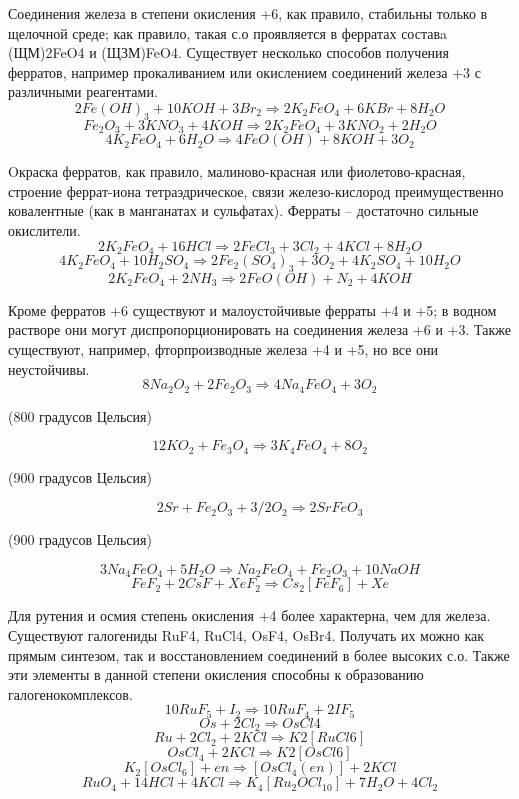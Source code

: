 \documentclass[11pt]{article}
\begin{document}
Соединения железа в степени окисления +6, как правило, стабильны только в щелочной
среде; как правило, такая с.о проявляется в ферратах составa (ЩМ)2FeO4 и (ЩЗМ)FeO4.
Существует несколько способов получения ферратов, например прокаливанием или
окислением соединений железа +3 с различными реагентами.
$$2Fe(OH) _3 + 10KOH + 3Br _2 \Rightarrow 2K _2 FeO _4 + 6KBr + 8H _2 O$$
$$Fe _2 O _3 + 3KNO _3 + 4KOH \Rightarrow 2K _2 FeO _4 + 3KNO _2 + 2H _2 O$$
$$4K _2 FeO _4 + 6H _2 O \Rightarrow 4FeO(OH) + 8KOH + 3O _2$$

Oкраска ферратов, как правило, малиново-красная или фиолетово-красная, строение
феррат-иона тетраэдрическое, связи железо-кислород преимущественно ковалентные
(как в манганатах и сульфатах). Ферраты – достаточно сильные окислители.
$$2K _2 FeO _4 + 16HCl \Rightarrow 2FeCl_3 + 3Cl_2 + 4KCl + 8H_2O$$
$$4K _2 FeO _4 + 10H_2SO_4 \Rightarrow 2Fe_2(SO_4)_3 + 3O_2 + 4K_2SO_4 + 10H_2O$$
$$2K _2 FeO _4 + 2NH_3 \Rightarrow 2FeO(OH) + N_2 + 4KOH$$

Кроме ферратов +6 существуют и малоустойчивые ферраты +4 и +5; в водном растворе
они могут диспропорционировать на соединения железа +6 и +3. Также существуют,
например, фторпроизводные железа +4 и +5, но все они неустойчивы.
$$8Na _2 O _2 + 2Fe _2 O _3 \Rightarrow 4Na _4 FeO _4 + 3O _2 $$
\begin{center}(800 градусов Цельсия)\end{center}
$$12KO _2 + Fe _3 O _4 \Rightarrow 3K _4 FeO _4 + 8O _2 $$
\begin{center}(900 градусов Цельсия)\end{center}
$$2Sr + Fe _2 O _3 + 3/2O _2 \Rightarrow 2SrFeO _3 $$
\begin{center}(900 градусов Цельсия)\end{center}
$$3Na _4 FeO _4 + 5H _2 O \Rightarrow Na_2 FeO _4 + Fe _2 O _3 + 10NaOH$$
$$FeF _2 + 2CsF + XeF _2 \Rightarrow Cs _2 [FeF _6 ] + Xe$$


Для рутения и осмия степень окисления +4 более характерна, чем для железа.
Существуют галогениды RuF4, RuCl4, OsF4, OsBr4. Получать их можно как прямым
синтезом, так и восстановлением соединений в более высоких с.о. Также эти элементы в
данной степени окисления способны к образованию галогенокомплексов.
$$10RuF _5 + I _2 \Rightarrow 10RuF _4 + 2IF _5$$
$$Os + 2Cl _2 \Rightarrow OsCl 4$$
$$Ru + 2Cl _2 + 2KCl \Rightarrow K 2 [RuCl 6 ]$$
$$OsCl _4 + 2KCl \Rightarrow K 2 [OsCl 6 ]$$
$$K _2 [OsCl _6 ] + en \Rightarrow [OsCl _4 (en)] + 2KCl$$
$$RuO _4 + 14HCl + 4KCl \Rightarrow K _4 [Ru _2 OCl _{10} ] + 7H _2 O + 4Cl _2$$
\end{document}
